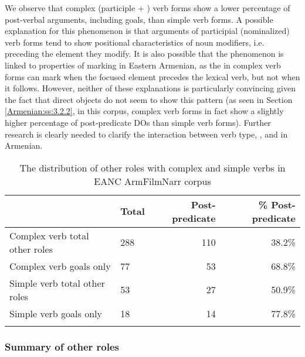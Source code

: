 \documentclass[output=paper,colorlinks,citecolor=brown,draftmode]{langscibook}
\begin{document}
 We observe that complex (participle + ) verb forms show a lower percentage of post-verbal arguments, including goals, than simple verb forms. A possible explanation for this phenomenon is that arguments of participial (nominalized) verb forms tend to show positional characteristics of noun modifiers, i.e. preceding the element they modify. It is also possible that the phenomenon is linked to properties of  marking in Eastern Armenian, as the  in complex verb forms can mark  when the focused element precedes the lexical verb, but not when it follows. However, neither of these explanations is particularly convincing given the fact that direct objects do not seem to show this pattern (as seen in Section \ref{Armenian:ss:3.2.2}, in this corpus, complex verb forms in fact show a slightly higher percentage of post-predicate DOs than simple verb forms). Further research is clearly needed to clarify the interaction between verb type, , and  in Armenian.

\begin{table}
    \begin{tabularx}{\textwidth}{lYrr}
\lsptoprule
& Total & Post-predicate & \% Post-predicate \\
\midrule
Complex verb total other roles & 288 & 110 & 38.2\% \\
Complex verb goals only & 77 & 53 & 68.8\% \\
Simple verb total other roles & 53 & 27 & 50.9\% \\
Simple verb goals only & 18 & 14 & 77.8\% \\
\lspbottomrule
    \end{tabularx}
    \caption{The distribution of other roles with complex and simple verbs in EANC ArmFilmNarr corpus }
    \label{Armenian:tab:24}
\end{table}

\subsubsection{Summary of other roles}\label{Armenian:ss:3.3.3}
\end{document}
